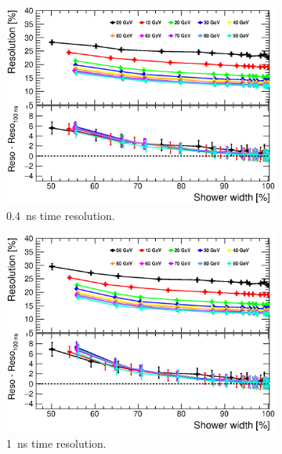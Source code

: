 \begin{figure}[htbp!]
  \centering
  \begin{subfigure}[t]{0.6\textwidth}
    \centering
    \includegraphics[width=1\linewidth]{../Thesis_Plots/ILD/Smearing_0.4ns/Plots/ShowerWidth_Resolution_Smearing1.eps}
    \caption{\SI{0.4}{\nano\second} time resolution.} \label{fig:WidthReso0.4ns}
  \end{subfigure}
  \begin{subfigure}[t]{0.6\textwidth}
    \centering
    \includegraphics[width=1\linewidth]{../Thesis_Plots/ILD/Smearing_1ns/Plots/ShowerWidth_Resolution_Smearing2.eps}
    \caption{\SI{1}{\nano\second} time resolution.} \label{fig:WidthReso1ns}
  \end{subfigure}
  \begin{subfigure}[t]{0.6\textwidth}

\end{subfigure}
\end{figure}

